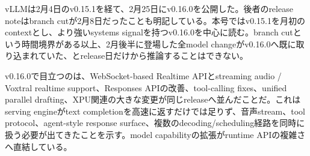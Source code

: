 vLLMは2月4日のv0.15.1を経て、2月25日にv0.16.0を公開した。後者のrelease noteはbranch cutが2月8日だったことも明記している。本号ではv0.15.1を月初のcontextとし、より強いsystems signalを持つv0.16.0を中心に読む。branch cutという時間境界がある以上、2月後半に登場した全model changeがv0.16.0へ既に取り込まれていた、とrelease日だけから推論することはできない。\autocite{src-5041feb6f87f,src-67307025f5d9}


v0.16.0で目立つのは、WebSocket-based Realtime APIとstreaming audio / Voxtral realtime support、Responses APIの改善、tool-calling fixes、unified parallel drafting、XPU関連の大きな変更が同じreleaseへ並んだことだ。これはserving engineがtext completionを高速に返すだけでは足りず、音声stream、tool protocol、agent-style response surface、複数のdecoding/scheduling経路を同時に扱う必要が出てきたことを示す。model capabilityの拡張がruntime APIの複雑さへ直結している。\autocite{src-5041feb6f87f}


